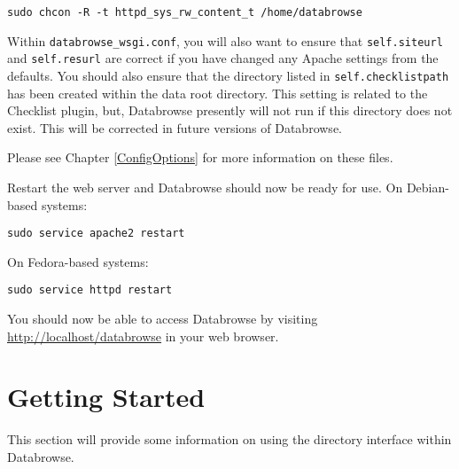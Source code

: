 \documentclass[10pt]{article}
\begin{document}
\begin{verbatim}
sudo chcon -R -t httpd_sys_rw_content_t /home/databrowse
\end{verbatim}

Within \texttt{databrowse\_wsgi.conf}, you will also want to ensure that \texttt{self.siteurl} and \texttt{self.resurl} are correct if you have changed any Apache settings from the defaults.  You should also ensure that the directory listed in \texttt{self.checklistpath} has been created within the data root directory.  This setting is related to the Checklist plugin, but, Databrowse presently will not run if this directory does not exist.  This will be corrected in future versions of Databrowse.

Please see Chapter \ref{ConfigOptions} for more information on these files.

Restart the web server and Databrowse should now be ready for use.  On Debian-based systems:

\begin{verbatim}
sudo service apache2 restart
\end{verbatim}

On Fedora-based systems:

\begin{verbatim}
sudo service httpd restart
\end{verbatim}

You should now be able to access Databrowse by visiting \url{http://localhost/databrowse} in your web browser.

\clearpage
\section{Getting Started}\label{GettingStarted}

This section will provide some information on using the directory interface within Databrowse.
\end{document}
